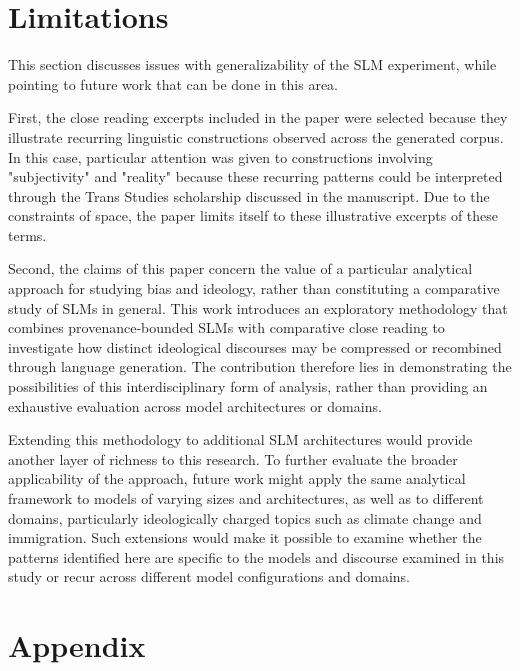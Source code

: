 \documentclass[anonymous,review]{acmart}
\begin{document}
\section{Limitations}
\label{limitations}

This section discusses issues with generalizability of the SLM experiment, while pointing to future work that can be done in this area.

First, the close reading excerpts included in the paper were selected because they illustrate recurring linguistic constructions observed across the generated corpus. In this case, particular attention was given to constructions involving "subjectivity" and "reality" because these recurring patterns could be interpreted through the Trans Studies scholarship discussed in the manuscript. Due to the constraints of space, the paper limits itself to these illustrative excerpts of these terms.

Second, the claims of this paper concern the value of a particular analytical approach for studying bias and ideology, rather than constituting a comparative study of SLMs in general. This work introduces an exploratory methodology that combines provenance-bounded SLMs with comparative close reading to investigate how distinct ideological discourses may be compressed or recombined through language generation. The contribution therefore lies in demonstrating the possibilities of this interdisciplinary form of analysis, rather than providing an exhaustive evaluation across model architectures or domains.

Extending this methodology to additional SLM architectures would provide another layer of richness to this research. To further evaluate the broader applicability of the approach, future work might apply the same analytical framework to models of varying sizes and architectures, as well as to different domains, particularly ideologically charged topics such as climate change and immigration. Such extensions would make it possible to examine whether the patterns identified here are specific to the models and discourse examined in this study or recur across different model configurations and domains.




\appendix

\section{Appendix}
\label{appendix}
\end{document}

